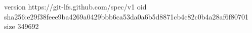 version https://git-lfs.github.com/spec/v1
oid sha256:e29f38feee9ba4269a0429bbb6ca53da0a6b5d8871cb4c82c0b4a28af6f80701
size 349692
